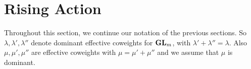 \documentclass{article} %
\begin{document}
\begin{comment}
\end{comment}




\section{Rising Action}
\label{s:theproblem}

Throughout this section, we continue our notation of the previous sections. So $ \lambda, \lambda', \lambda''$ denote dominant effective coweights for $ {\mathbf{GL}}_m$, with $ \lambda' + \lambda'' = \lambda$.  Also $ \mu, \mu', \mu''$ are effective coweights with $ \mu = \mu' + \mu''$ and we assume that $ \mu$ is dominant.
\end{document}
